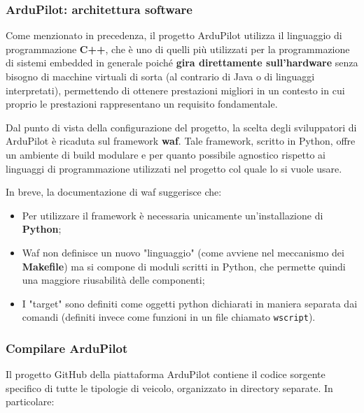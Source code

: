 \documentclass[a4paper, 12pt, oneside]{article}
\theoremstyle{definition}
\begin{document}
\subsubsection{ArduPilot: architettura software}
Come menzionato in precedenza, il progetto ArduPilot utilizza il linguaggio di programmazione \textbf{C++}, che è uno di quelli più utilizzati per la programmazione di sistemi embedded in generale poiché \textbf{gira direttamente sull'hardware} senza bisogno di macchine virtuali di sorta (al contrario di Java o di linguaggi interpretati), permettendo di ottenere prestazioni migliori in un contesto in cui proprio le prestazioni rappresentano un requisito fondamentale.

Dal punto di vista della configurazione del progetto, la scelta degli sviluppatori di ArduPilot è ricaduta sul framework \textbf{waf}. Tale framework, scritto in Python, offre un ambiente di build modulare e per quanto possibile agnostico rispetto ai linguaggi di programmazione utilizzati nel progetto col quale lo si vuole usare.

In breve, la documentazione di waf \cite{waf} suggerisce che:

\begin{itemize}
    \item Per utilizzare il framework è necessaria unicamente un'installazione di \textbf{Python};
    \item Waf non definisce un nuovo "linguaggio" (come avviene nel meccanismo dei \textbf{Makefile}) ma si compone di moduli scritti in Python, che permette quindi una maggiore riusabilità delle componenti;
    \item I "target" sono definiti come oggetti python dichiarati in maniera separata dai comandi (definiti invece come funzioni in un file chiamato \texttt{wscript}).
\end{itemize}

\subsubsection{Compilare ArduPilot}

Il progetto GitHub della piattaforma ArduPilot contiene il codice sorgente specifico di tutte le tipologie di veicolo, organizzato in directory separate\cite{ardupilot-github}. In particolare:
\end{document}
